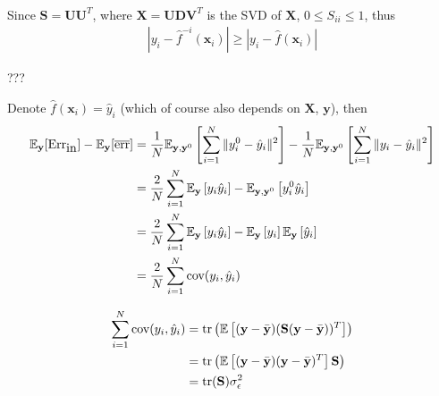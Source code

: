 \begin{exercise}
\begin{exerciseSection}
\begin{align}
    \end{align}
  \end{exerciseSection}
  \begin{exerciseSection}
    Since $\mathbf{S} = \mathbf{UU}^T$, where $\mathbf{X} = \mathbf{UDV}^T$ is
    the SVD of $\mathbf{X}$, $0\leq S_{ii}\leq 1$, thus
    \begin{align}
      \left|y_i-\hat{f}^{-i}(\mathbf{x}_i)\right| \geq
      \left|y_i-\hat{f}(\mathbf{x}_i)\right|
    \end{align}
  \end{exerciseSection}
  \begin{exerciseSection}
    ???
  \end{exerciseSection}
\end{exercise}

\begin{exercise}
  Denote $\hat{f}(\mathbf{x}_i) = \hat{y}_i$ (which of course also depends on
  $\mathbf{X}$, $\mathbf{y}$), then
  \begin{align}
    \mathbb{E}_{\mathbf{y}}[\mbox{Err}_{\mbox{in}}] -
    \mathbb{E}_{\mathbf{y}}[\overline{\mbox{err}}] & =
    \frac{1}{N}\mathbb{E}_{\mathbf{y}, \mathbf{y}^0} \left[\sum_{i=1}^N
    \|y_i^0 - \hat{y}_i\|^2 \right] - \frac{1}{N} \mathbb{E}_{\mathbf{y},
    \mathbf{y}^0} \left[\sum_{i=1}^N \|y_i - \hat{y}_i\|^2 \right] \notag\\
    &= \frac{2}{N}\sum_{i=1}^N \mathbb{E}_{\mathbf{y}}\left[y_i\hat{y}_i \right]
    - \mathbb{E}_{\mathbf{y},\mathbf{y}^0}\left[y_i^0\hat{y}_i \right] \notag\\
    &= \frac{2}{N}\sum_{i=1}^N \mathbb{E}_{\mathbf{y}}\left[y_i\hat{y}_i \right]
    - \mathbb{E}_{\mathbf{y}}\left[y_i\right]
    \mathbb{E}_{\mathbf{y}}\left[\hat{y}_i \right] \notag\\
    &= \frac{2}{N}\sum_{i=1}^N\mbox{cov}(y_i, \hat{y}_i)
  \end{align}
\end{exercise}

\begin{exercise}
  \begin{align}
    \sum_{i=1}^N \mbox{cov}(y_i, \hat{y}_i) &= \mbox{tr} \left(\mathbb{E}\left[
    (\mathbf{y} - \bar{\mathbf{y}})(\mathbf{S}(\mathbf{y} -
    \bar{\mathbf{y}}))^T\right] \right) \notag\\
    &= \mbox{tr}\left(\mathbb{E}\left[(\mathbf{y} - \bar{\mathbf{y}})(\mathbf{y}
    - \bar{\mathbf{y}})^T \right]\mathbf{S} \right) \notag\\
    &= \mbox{tr}(\mathbf{S})\sigma_{\epsilon}^2
  \end{align}
\end{exercise}

